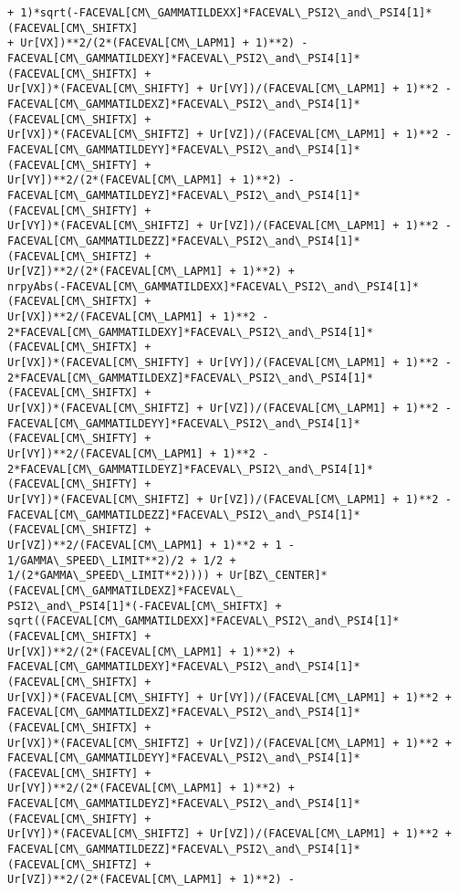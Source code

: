 \documentclass[landscape,letterpaper,10pt,english]{article}
\begin{document}
\begin{Verbatim}[commandchars=\\\{\}]
+ 1)*sqrt(-FACEVAL[CM\_GAMMATILDEXX]*FACEVAL\_PSI2\_and\_PSI4[1]*(FACEVAL[CM\_SHIFTX]
+ Ur[VX])**2/(2*(FACEVAL[CM\_LAPM1] + 1)**2) -
FACEVAL[CM\_GAMMATILDEXY]*FACEVAL\_PSI2\_and\_PSI4[1]*(FACEVAL[CM\_SHIFTX] +
Ur[VX])*(FACEVAL[CM\_SHIFTY] + Ur[VY])/(FACEVAL[CM\_LAPM1] + 1)**2 -
FACEVAL[CM\_GAMMATILDEXZ]*FACEVAL\_PSI2\_and\_PSI4[1]*(FACEVAL[CM\_SHIFTX] +
Ur[VX])*(FACEVAL[CM\_SHIFTZ] + Ur[VZ])/(FACEVAL[CM\_LAPM1] + 1)**2 -
FACEVAL[CM\_GAMMATILDEYY]*FACEVAL\_PSI2\_and\_PSI4[1]*(FACEVAL[CM\_SHIFTY] +
Ur[VY])**2/(2*(FACEVAL[CM\_LAPM1] + 1)**2) -
FACEVAL[CM\_GAMMATILDEYZ]*FACEVAL\_PSI2\_and\_PSI4[1]*(FACEVAL[CM\_SHIFTY] +
Ur[VY])*(FACEVAL[CM\_SHIFTZ] + Ur[VZ])/(FACEVAL[CM\_LAPM1] + 1)**2 -
FACEVAL[CM\_GAMMATILDEZZ]*FACEVAL\_PSI2\_and\_PSI4[1]*(FACEVAL[CM\_SHIFTZ] +
Ur[VZ])**2/(2*(FACEVAL[CM\_LAPM1] + 1)**2) +
nrpyAbs(-FACEVAL[CM\_GAMMATILDEXX]*FACEVAL\_PSI2\_and\_PSI4[1]*(FACEVAL[CM\_SHIFTX] +
Ur[VX])**2/(FACEVAL[CM\_LAPM1] + 1)**2 -
2*FACEVAL[CM\_GAMMATILDEXY]*FACEVAL\_PSI2\_and\_PSI4[1]*(FACEVAL[CM\_SHIFTX] +
Ur[VX])*(FACEVAL[CM\_SHIFTY] + Ur[VY])/(FACEVAL[CM\_LAPM1] + 1)**2 -
2*FACEVAL[CM\_GAMMATILDEXZ]*FACEVAL\_PSI2\_and\_PSI4[1]*(FACEVAL[CM\_SHIFTX] +
Ur[VX])*(FACEVAL[CM\_SHIFTZ] + Ur[VZ])/(FACEVAL[CM\_LAPM1] + 1)**2 -
FACEVAL[CM\_GAMMATILDEYY]*FACEVAL\_PSI2\_and\_PSI4[1]*(FACEVAL[CM\_SHIFTY] +
Ur[VY])**2/(FACEVAL[CM\_LAPM1] + 1)**2 -
2*FACEVAL[CM\_GAMMATILDEYZ]*FACEVAL\_PSI2\_and\_PSI4[1]*(FACEVAL[CM\_SHIFTY] +
Ur[VY])*(FACEVAL[CM\_SHIFTZ] + Ur[VZ])/(FACEVAL[CM\_LAPM1] + 1)**2 -
FACEVAL[CM\_GAMMATILDEZZ]*FACEVAL\_PSI2\_and\_PSI4[1]*(FACEVAL[CM\_SHIFTZ] +
Ur[VZ])**2/(FACEVAL[CM\_LAPM1] + 1)**2 + 1 - 1/GAMMA\_SPEED\_LIMIT**2)/2 + 1/2 +
1/(2*GAMMA\_SPEED\_LIMIT**2)))) + Ur[BZ\_CENTER]*(FACEVAL[CM\_GAMMATILDEXZ]*FACEVAL\_
PSI2\_and\_PSI4[1]*(-FACEVAL[CM\_SHIFTX] +
sqrt((FACEVAL[CM\_GAMMATILDEXX]*FACEVAL\_PSI2\_and\_PSI4[1]*(FACEVAL[CM\_SHIFTX] +
Ur[VX])**2/(2*(FACEVAL[CM\_LAPM1] + 1)**2) +
FACEVAL[CM\_GAMMATILDEXY]*FACEVAL\_PSI2\_and\_PSI4[1]*(FACEVAL[CM\_SHIFTX] +
Ur[VX])*(FACEVAL[CM\_SHIFTY] + Ur[VY])/(FACEVAL[CM\_LAPM1] + 1)**2 +
FACEVAL[CM\_GAMMATILDEXZ]*FACEVAL\_PSI2\_and\_PSI4[1]*(FACEVAL[CM\_SHIFTX] +
Ur[VX])*(FACEVAL[CM\_SHIFTZ] + Ur[VZ])/(FACEVAL[CM\_LAPM1] + 1)**2 +
FACEVAL[CM\_GAMMATILDEYY]*FACEVAL\_PSI2\_and\_PSI4[1]*(FACEVAL[CM\_SHIFTY] +
Ur[VY])**2/(2*(FACEVAL[CM\_LAPM1] + 1)**2) +
FACEVAL[CM\_GAMMATILDEYZ]*FACEVAL\_PSI2\_and\_PSI4[1]*(FACEVAL[CM\_SHIFTY] +
Ur[VY])*(FACEVAL[CM\_SHIFTZ] + Ur[VZ])/(FACEVAL[CM\_LAPM1] + 1)**2 +
FACEVAL[CM\_GAMMATILDEZZ]*FACEVAL\_PSI2\_and\_PSI4[1]*(FACEVAL[CM\_SHIFTZ] +
Ur[VZ])**2/(2*(FACEVAL[CM\_LAPM1] + 1)**2) -

\end{Verbatim}
\end{document}
